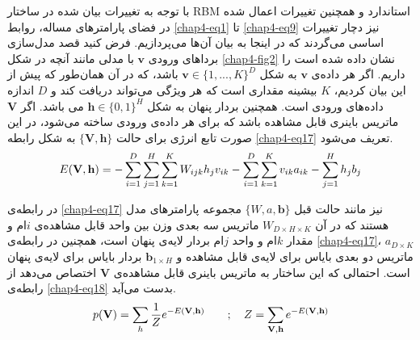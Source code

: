 با توجه به تغییرات بیان شده در ساختار
RBM
استاندارد و همچنین تغییرات اعمال شده در فضای پارامتر‌های مساله، روابط
\ref{chap4-eq1}
تا
\ref{chap4-eq9}
نیز دچار تغییرات اساسی‌ می‌‌گردند که در اینجا به بیان آن‌ها می‌پردازیم. فرض کنید قصد مدل‌سازی بردا‌های ورودی
$\textbf{v}$
با مدلی‌ مانند آنچه در شکل
\ref{chap4-fig2}
نشان داده شده است را داریم. اگر هر داده‌ی
$\textbf{v}$
به شکل
$\textbf{v} \in \{1, ..., K\}^D$
باشد، که در آن همان‌طور که پیش از این بیان کردیم،
$K$
بیشینه مقداری است که هر ویژگی‌ می‌‌تواند دریافت کند و
$D$
اندازه داده‌های ورودی است. همچنین بردار پنهان به شکل
$\textbf{h} \in \{0,1\}^H$
می‌ باشد. اگر
$\textbf{V}$
ماتریس باینری قابل مشاهده باشد که برای هر داده‌ی ورودی ساخته می‌‌شود، در این صورت تابع انرژی برای حالت
$\{\textbf{V},\textbf{h}\}$
به شکل رابطه
\ref{chap4-eq17}
تعریف می‌‌شود.
\begin{align}
	\centering
	\label{chap4-eq17}
	E(\textbf{V},\textbf{h})=-\sum_{i=1}^{D}\sum_{j=1}^{H}\sum_{k=1}^{K}W_{ijk}h_jv_{ik}-\sum_{i=1}^{D}\sum_{k=1}^{K}v_{ik}a_{ik} - \sum_{j=1}^{H}h_jb_j
\end{align}

در رابطه‌ی‌
\ref{chap4-eq17}
نیز مانند حالت قبل
$\{W, a, \textbf{b}\}$
مجموعه پارامتر‌های مدل هستند که در آن
$W_{D \times H \times K}$
ماتریس سه‌ بعدی وزن بین واحد قابل مشاهده‌ی
$i$ام
 و مقدار
$k$ام
 و واحد
$j$ام 
بردار لایه‌ی پنهان است، همچنین در رابطه‌ی
\ref{chap4-eq17}، $a_{D \times K}$
ماتریس دو بعدی بایاس برای لایه‌ی قابل مشاهده و
$\textbf{b}_{1 \times H}$
بردار بایاس برای لایه‌ی پنهان است. احتمالی‌ که این ساختار به ماتریس باینری قابل مشاهده‌ی
$\textbf{V}$
اختصاص می‌‌دهد از رابطه‌ی
\ref{chap4-eq18}
 بدست می‌‌آید.
 \begin{align}
 	\centering
 	\label{chap4-eq18}
 	p(\textbf{V}) = \sum_{h} \dfrac{1}{Z} e^{-E(\textbf{V},\textbf{h})} \quad\quad ; \quad
 	Z = \sum_{\textbf{V},\textbf{h}} e^{-E(\textbf{V},\textbf{h})} 
 \end{align}

